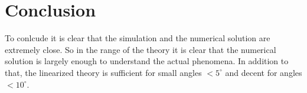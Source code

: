 \newpage
\section{Conclusion}

To conlcude it is clear that the simulation and the numerical solution are extremely close. So in the range of the theory it is clear that the numerical solution is largely enough to understand the actual phenomena. In addition to that, the linearized theory is sufficient for small angles $<5^{\circ}$ and decent for angles $<10^{\circ}$. 